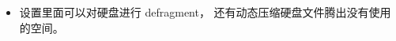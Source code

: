 
\begin{issues}
\issueDraft
\end{issues}

\begin{itemize}
\item 设置里面可以对硬盘进行 defragment， 还有动态压缩硬盘文件腾出没有使用的空间。
\end{itemize}
